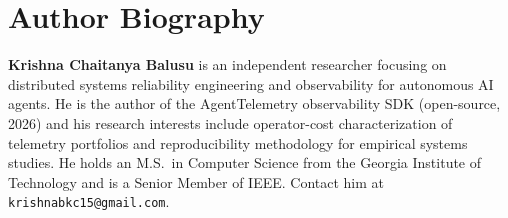 \documentclass[journal]{IEEEtran}
\begin{document}
\section*{Author Biography}

\textbf{Krishna Chaitanya Balusu} is an independent researcher focusing on distributed systems reliability engineering and observability for autonomous AI agents. He is the author of the AgentTelemetry observability SDK (open-source, 2026) and his research interests include operator-cost characterization of telemetry portfolios and reproducibility methodology for empirical systems studies. He holds an M.S.\ in Computer Science from the Georgia Institute of Technology and is a Senior Member of IEEE. Contact him at \texttt{krishnabkc15@gmail.com}.
\end{document}
